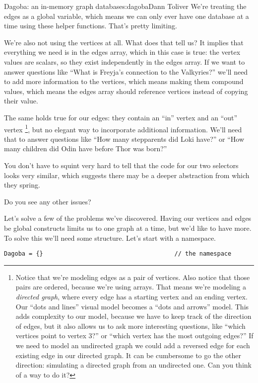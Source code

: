 \begin{aosachapter}{Dagoba: an in-memory graph database}{s:dagoba}{Dann Toliver}
We're treating the edges as a global variable, which means we can only
ever have one database at a time using these helper functions. That's
pretty limiting.

We're also not using the vertices at all. What does that tell us? It
implies that everything we need is in the edges array, which in this
case is true: the vertex values are scalars, so they exist independently
in the edges array. If we want to answer questions like ``What is
Freyja's connection to the Valkyries?'' we'll need to add more
information to the vertices, which means making them compound values,
which means the edges array should reference vertices instead of copying
their value.

The same holds true for our edges: they contain an ``in'' vertex and an
``out'' vertex \footnote{Notice that we're modeling edges as a pair of
  vertices. Also notice that those pairs are ordered, because we're
  using arrays. That means we're modeling a \emph{directed graph}, where
  every edge has a starting vertex and an ending vertex. Our ``dots and
  lines'' visual model becomes a ``dots and arrows'' model. This adds
  complexity to our model, because we have to keep track of the
  direction of edges, but it also allows us to ask more interesting
  questions, like ``which vertices point to vertex 3?'' or ``which
  vertex has the most outgoing edges?'' If we need to model an
  undirected graph we could add a reversed edge for each existing edge
  in our directed graph. It can be cumbersome to go the other direction:
  simulating a directed graph from an undirected one. Can you think of a
  way to do it?}, but no elegant way to incorporate additional
information. We'll need that to answer questions like ``How many
stepparents did Loki have?'' or ``How many children did Odin have before
Thor was born?''

You don't have to squint very hard to tell that the code for our two
selectors looks very similar, which suggests there may be a deeper
abstraction from which they spring.

Do you see any other issues?

\label{build-a-better-graph}

Let's solve a few of the problems we've discovered. Having our vertices
and edges be global constructs limits us to one graph at a time, but
we'd like to have more. To solve this we'll need some structure. Let's
start with a namespace.

\begin{verbatim}
Dagoba = {}                                     // the namespace
\end{verbatim}


\end{aosachapter}
